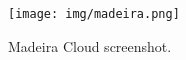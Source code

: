 \begin{figure}[tb]
  \texttt{[image: img/madeira.png]}
  \caption{Madeira Cloud screenshot.}
  \label{fig:madiera}
\end{figure}
